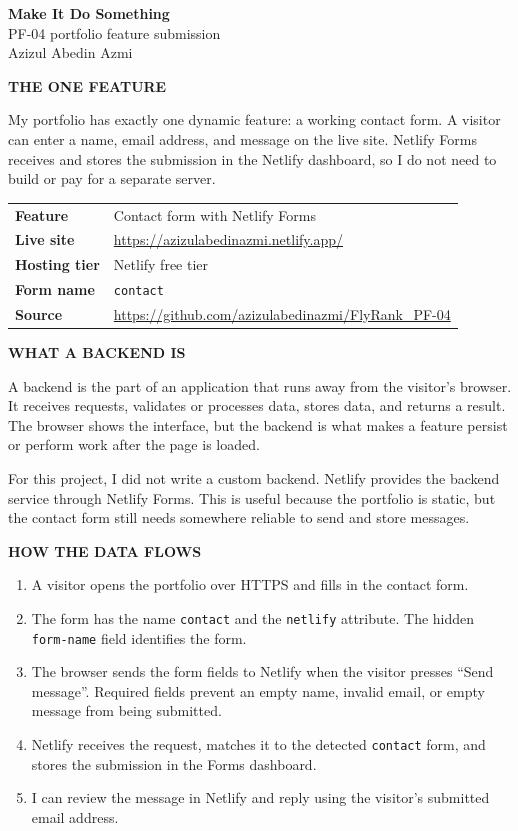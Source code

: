 \documentclass[10pt,a4paper]{article}
\newcommand{\kicker}[1]{{\sffamily\bfseries\small\color{teal}\MakeUppercase{#1}}}
\newcommand{\sect}[1]{\needspace{5\baselineskip}\vspace{0.5em}\par\kicker{#1}\par\vspace{-0.5em}{\color{rule}\rule{\linewidth}{0.5pt}}\par\vspace{-0.2em}}
\begin{document}
\begin{center}
  {\sffamily\bfseries\LARGE Make It Do Something}\\[0.2em]
  {\sffamily\large PF-04 portfolio feature submission}\\[0.4em]
  Azizul Abedin Azmi
\end{center}

\sect{The one feature}

My portfolio has exactly one dynamic feature: a working contact form. A visitor
can enter a name, email address, and message on the live site. Netlify Forms
receives and stores the submission in the Netlify dashboard, so I do not need
to build or pay for a separate server.

\begin{tabularx}{\linewidth}{@{}lY@{}}
\toprule
\textbf{Feature} & Contact form with Netlify Forms\\
\textbf{Live site} & \url{https://azizulabedinazmi.netlify.app/}\\
\textbf{Hosting tier} & Netlify free tier\\
\textbf{Form name} & \texttt{contact}\\
\textbf{Source} & \url{https://github.com/azizulabedinazmi/FlyRank_PF-04}\\
\bottomrule
\end{tabularx}

\sect{What a backend is}

A backend is the part of an application that runs away from the visitor's
browser. It receives requests, validates or processes data, stores data, and
returns a result. The browser shows the interface, but the backend is what
makes a feature persist or perform work after the page is loaded.

For this project, I did not write a custom backend. Netlify provides the
backend service through Netlify Forms. This is useful because the portfolio
is static, but the contact form still needs somewhere reliable to send and
store messages.

\sect{How the data flows}

\begin{enumerate}[leftmargin=1.5em,itemsep=2pt]
  \item A visitor opens the portfolio over HTTPS and fills in the contact
        form.
  \item The form has the name \texttt{contact} and the \texttt{netlify}
        attribute. The hidden \texttt{form-name} field identifies the form.
  \item The browser sends the form fields to Netlify when the visitor presses
        ``Send message''. Required fields prevent an empty name, invalid email,
        or empty message from being submitted.
  \item Netlify receives the request, matches it to the detected
        \texttt{contact} form, and stores the submission in the Forms
        dashboard.
  \item I can review the message in Netlify and reply using the visitor's
        submitted email address.
\end{enumerate}
\end{document}
